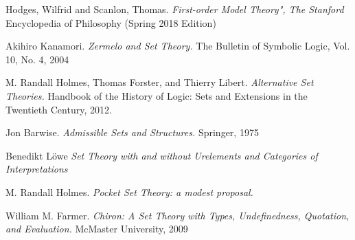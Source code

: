 \documentclass[12pt]{article}
\theoremstyle{definition}
\begin{document}
\begin{thebibliography}{9}
Hodges, Wilfrid and Scanlon, Thomas.
\textit{First-order Model Theory", The Stanford} Encyclopedia of Philosophy (Spring 2018 Edition)

Akihiro Kanamori.
\textit{Zermelo and Set Theory.}
The Bulletin of Symbolic Logic, Vol. 10, No. 4, 2004

M. Randall Holmes, Thomas Forster, and Thierry Libert.
\textit{Alternative Set Theories.}
Handbook of the History of Logic: Sets and Extensions in the Twentieth Century, 2012.

Jon Barwise.
\textit{Admissible Sets and Structures.}
Springer, 1975

Benedikt L\"owe
\textit{Set Theory with and without Urelements and Categories of Interpretations}

M. Randall Holmes.
\textit{Pocket Set Theory: a modest proposal.}

William M. Farmer.
\textit{Chiron: A Set Theory with Types,
Undefinedness, Quotation, and Evaluation.}
McMaster University, 2009

\end{thebibliography}
\end{document}
